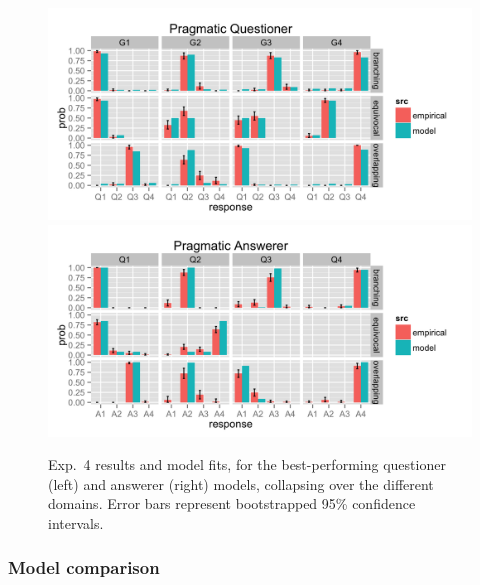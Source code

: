 \documentclass[12pt, floatsintext, jou]{apa6}
\begin{document}
\begin{figure}[t!]
\begin{center}
\includegraphics[scale = .25]{Exp4QuestResults}
\includegraphics[scale = .25]{Exp4AnsResults}
\end{center}
\vspace{-.5cm}
\caption{Exp.~4 results and model fits, for the best-performing questioner (left) and answerer (right) models, collapsing over the different domains. Error bars represent bootstrapped 95\% confidence intervals.}
\vspace{-.1cm}
\label{fig:exp4res}
\end{figure}

\subsubsection{Model comparison}
\end{document}
